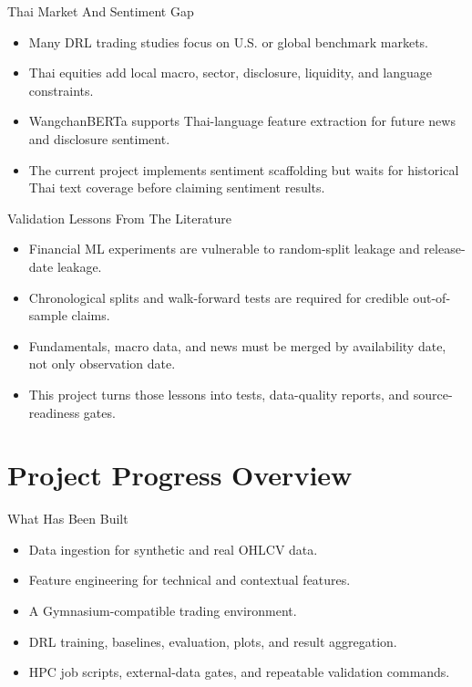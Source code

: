 \documentclass[aspectratio=43,10pt]{beamer}
\begin{document}
\begin{frame}{Thai Market And Sentiment Gap}
\begin{itemize}
  \item Many DRL trading studies focus on U.S. or global benchmark markets.
  \item Thai equities add local macro, sector, disclosure, liquidity, and language constraints.
  \item WangchanBERTa supports Thai-language feature extraction for future news and disclosure sentiment.
  \item The current project implements sentiment scaffolding but waits for historical Thai text coverage before claiming sentiment results.
\end{itemize}
\end{frame}

\begin{frame}{Validation Lessons From The Literature}
\begin{itemize}
  \item Financial ML experiments are vulnerable to random-split leakage and release-date leakage.
  \item Chronological splits and walk-forward tests are required for credible out-of-sample claims.
  \item Fundamentals, macro data, and news must be merged by availability date, not only observation date.
  \item This project turns those lessons into tests, data-quality reports, and source-readiness gates.
\end{itemize}
\end{frame}

\section{Project Progress Overview}

\begin{frame}{What Has Been Built}
\begin{itemize}
  \item Data ingestion for synthetic and real OHLCV data.
  \item Feature engineering for technical and contextual features.
  \item A Gymnasium-compatible trading environment.
  \item DRL training, baselines, evaluation, plots, and result aggregation.
  \item HPC job scripts, external-data gates, and repeatable validation commands.
\end{itemize}
\end{frame}
\end{document}
